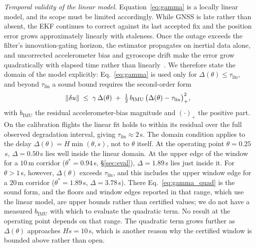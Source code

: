 \emph{Temporal validity of the linear model.} Equation~\eqref{eq:gamma} is a
locally linear model, and its scope must be limited accordingly. While GNSS is
late rather than absent, the EKF continues to correct against its last accepted
fix and the position error grows approximately linearly with staleness. Once
the outage exceeds the filter's innovation-gating horizon, the estimator
propagates on inertial data alone, and uncorrected accelerometer bias and
gyroscope drift make the error grow quadratically with elapsed time rather than
linearly~\cite{kong2024px4ekf}. We therefore state the domain of the model
explicitly: Eq.~\eqref{eq:gamma} is used only for
$\Delta(\theta)\le\tau_{\mathrm{lin}}$, and beyond $\tau_{\mathrm{lin}}$ a
sound bound requires the second-order form
\begin{equation}
\label{eq:gamma_quad}
\left\lVert \delta u\right\rVert\;\le\;\gamma\,\Delta(\theta)\;+\;\tfrac12\,b_{\mathrm{IMU}}\,\big(\Delta(\theta)-\tau_{\mathrm{lin}}\big)_{+}^{2},
\end{equation}
with $b_{\mathrm{IMU}}$ the residual accelerometer-bias magnitude and
$(\cdot)_+$ the positive part. On the calibration flights the linear fit holds
to within its residual over the full observed degradation interval, giving
$\tau_{\mathrm{lin}}\approx2$\,s. The domain condition applies to the delay
$\Delta(\theta)=H\min(\theta,s)$, not to $\theta$ itself. At the operating point
$\theta=0.25$\,s, $\Delta=0.50$\,s lies well inside the linear domain. At the
upper edge of the window for a $10$\,m corridor ($\theta^{*}=0.94$\,s,
\S\ref{sec:eval}), $\Delta=1.89$\,s lies just inside it. For $\theta>1$\,s,
however, $\Delta(\theta)$ exceeds $\tau_{\mathrm{lin}}$, and this includes the
upper window edge for a $20$\,m corridor ($\theta^{*}=1.89$\,s,
$\Delta=3.78$\,s). There Eq.~\eqref{eq:gamma_quad} is the sound form, and the
floors and window edges reported in that range, which use the linear model, are
upper bounds rather than certified values; we do not have a measured
$b_{\mathrm{IMU}}$ with which to evaluate the quadratic term. No result at the
operating point depends on that range. The quadratic term grows further as
$\Delta(\theta)$ approaches $Hs=10$\,s, which is another reason why the certified
window is bounded above rather than open.

\begin{table}[t]
\centering
\caption{The measured delay-to-position rate $\gamma$ from three real PX4
flights (one benign reference, one GPS-jamming, one GPS-spoofing) in the
, self-referenced to the pre-attack median.
``noise'' is the $95$th percentile of pre-attack position error;
$\gamma_{\mathrm{lsq}}$ and $\gamma_{\mathrm{peak}}$ are the least-squares and
peak-secant growth rates after attack onset. The flights serve as same-platform
calibration data for $\gamma$; they are not released as pairing records
(\S\ref{sec:provenance_dist}).}
\label{tab:whelan}
\scriptsize
\renewcommand{\arraystretch}{1.1}

\end{table}

